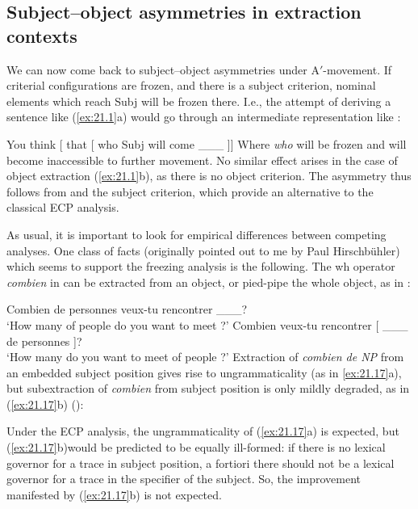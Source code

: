 \documentclass[output=paper]{langsci/langscibook}
\begin{document}
\begin{exe}
\section{Subject--object asymmetries in extraction contexts}

We can now come back to subject--object asymmetries under A$'$-movement. If
criterial configurations are frozen, and there is a subject criterion, nominal
elements which reach Subj will be frozen there. I.e., the attempt of deriving a
sentence like (\ref{ex:21.1}a) would go through an intermediate
representation like :

\ea%
    \label{ex:21.15}
    You think [ that [ who Subj\tss{[$+$N]} will come \_\_\_ ]]
\z
%
Where \emph{who} will be frozen and will become inaccessible to further
movement. No similar effect arises in the case of object extraction
(\ref{ex:21.1}b), as there is no object criterion. The asymmetry thus
follows from  and the subject criterion, which provide
an alternative to the classical \gls{ECP}
analysis.

As usual, it is important to look for empirical differences between competing
analyses. One class of facts (originally pointed out to me by Paul
Hirschbühler) which seems to support the freezing analysis is the following.
The wh operator \emph{combien} in  can be extracted from an object,
or pied-pipe the whole object, as in :

\ea%
    \label{ex:21.16}
    \ea Combien de personnes veux-tu rencontrer \_\_\_?\\
        ‘How many of people do you want to meet ?’
    \ex Combien veux-tu rencontrer [ \_\_\_ de personnes ]?\\
        ‘How many do you want to meet of people ?’
    \z
\z
%
Extraction of \emph{combien de NP} from an embedded subject position gives rise
to ungrammaticality (as in \ref{ex:21.17}a), but subextraction of
\emph{combien} from subject position is only mildly degraded, as in
(\ref{ex:21.17}b) (\citealt{Obenauer1976,Kayne1984}):

\ea%
    \label{ex:21.17}
    \z
\z
%
Under the \gls{ECP} analysis, the ungrammaticality of (\ref{ex:21.17}a) is
expected, but (\ref{ex:21.17}b)\linebreak would be predicted to be equally ill-formed:
if there is no lexical governor for a trace in subject position, a fortiori
there should not be a lexical governor for a trace in the specifier of the
subject. So, the improvement manifested by (\ref{ex:21.17}b) is not expected.


\end{exe}
\end{document}
